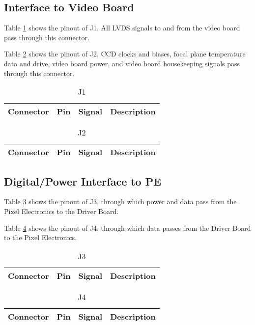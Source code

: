 \documentclass[a4paper,12pt]{article}
\begin{document}
\subsection{Interface to Video Board}

Table \ref{J1} shows the pinout of J1. All LVDS signals to and from the video board pass through this connector.

Table \ref{J2} shows the pinout of J2. CCD clocks and biases, focal plane temperature data and drive, video board power, and video board housekeeping signals pass through this connector.

\begin{table}[h]
\centering
\begin{tabular}{|l|l|l|l|}
\hline
 Connector & Pin & Signal & Description \\
\hline

\hline
\end{tabular}
\caption{J1}
\label{J1}
\end{table}

\begin{table}[h]
\centering
{\small
\begin{tabular}{|l|l|l|l|}
\hline
 Connector & Pin & Signal & Description \\
\hline

\hline
\end{tabular}
}
\caption{J2}
\label{J2}
\end{table}

\subsection{Digital/Power Interface to PE}

Table \ref{J3} shows the pinout of J3, through which power and data pass from the Pixel Electronics to the Driver Board.

Table \ref{J4} shows the pinout of J4, through which data passes from the Driver Board to the Pixel Electronics.

\begin{table}[h]
\centering
{\small
\begin{tabular}{|l|l|l|l|}
\hline
 Connector & Pin & Signal & Description \\
\hline

\hline
\end{tabular}
}
\caption{J3}
\label{J3}
\end{table}

\begin{table}[h]
\centering
{\small
\begin{tabular}{|l|l|l|l|}
\hline
 Connector & Pin & Signal & Description \\
\hline

\hline
\end{tabular}
}
\caption{J4}
\label{J4}
\end{table}
\end{document}
